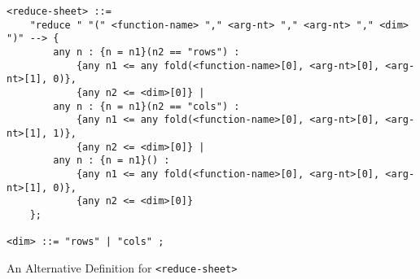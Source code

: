 \begin{listing}[!htb]
\begin{verbatim}
<reduce-sheet> ::= 
    "reduce " "(" <function-name> "," <arg-nt> "," <arg-nt> "," <dim> ")" --> {
        any n : {n = n1}(n2 == "rows") : 
            {any n1 <= any fold(<function-name>[0], <arg-nt>[0], <arg-nt>[1], 0)},
            {any n2 <= <dim>[0]} |
        any n : {n = n1}(n2 == "cols") : 
            {any n1 <= any fold(<function-name>[0], <arg-nt>[0], <arg-nt>[1], 1)},
            {any n2 <= <dim>[0]} |
        any n : {n = n1}() : 
            {any n1 <= any fold(<function-name>[0], <arg-nt>[0], <arg-nt>[1], 0)},
            {any n2 <= <dim>[0]}
    };

<dim> ::= "rows" | "cols" ;
\end{verbatim}
\caption{An Alternative Definition for \texttt{<reduce-sheet>}}
\label{lst:an_alternative_definition_for_reduce_sheet}
\end{listing}



